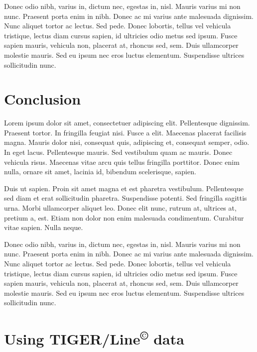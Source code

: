 \documentclass[11pt,letterpaper,onecolumn,twoside,openright,draft]{report}
\begin{document}
Donec odio nibh, varius in, dictum nec, egestas in, nisl.
Mauris varius mi non nunc.
Praesent porta enim in nibh.
Donec ac mi varius ante malesuada dignissim.
Nunc aliquet tortor ac lectus.
Sed pede.
Donec lobortis, tellus vel vehicula tristique, lectus diam cursus sapien, id ultricies odio metus sed ipsum.
Fusce sapien mauris, vehicula non, placerat at, rhoncus sed, sem.
Duis ullamcorper molestie mauris.
Sed eu ipsum nec eros luctus elementum.
Suspendisse ultrices sollicitudin nunc.


\chapter{Conclusion}
Lorem ipsum dolor sit amet, consectetuer adipiscing elit. Pellentesque dignissim.
Praesent tortor.
In fringilla feugiat nisi.
Fusce a elit.
Maecenas placerat facilisis magna.
Mauris dolor nisi, consequat quis, adipiscing et, consequat semper, odio.
In eget lacus.
Pellentesque mauris.
Sed vestibulum quam ac mauris.
Donec vehicula risus.
Maecenas vitae arcu quis tellus fringilla porttitor.
Donec enim nulla, ornare sit amet, lacinia id, bibendum scelerisque, sapien.

Duis ut sapien.
Proin sit amet magna et est pharetra vestibulum.
Pellentesque sed diam et erat sollicitudin pharetra.
Suspendisse potenti.
Sed fringilla sagittis urna.
Morbi ullamcorper aliquet leo.
Donec elit nunc, rutrum at, ultrices at, pretium a, est.
Etiam non dolor non enim malesuada condimentum.
Curabitur vitae sapien.
Nulla neque.

Donec odio nibh, varius in, dictum nec, egestas in, nisl.
Mauris varius mi non nunc.
Praesent porta enim in nibh.
Donec ac mi varius ante malesuada dignissim.
Nunc aliquet tortor ac lectus.
Sed pede.
Donec lobortis, tellus vel vehicula tristique, lectus diam cursus sapien, id ultricies odio metus sed ipsum.
Fusce sapien mauris, vehicula non, placerat at, rhoncus sed, sem.
Duis ullamcorper molestie mauris.
Sed eu ipsum nec eros luctus elementum.
Suspendisse ultrices sollicitudin nunc.


\appendix
\chapter{Using TIGER/Line\textsuperscript{\scriptsize{\copyright}} data}
\end{document}
